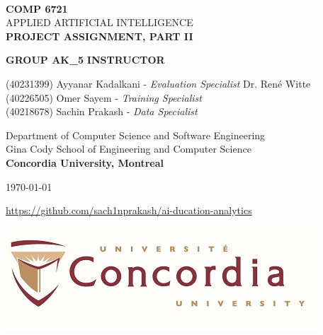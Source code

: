 \begin{titlepage}
    \begin{center}
        \textbf{\Large\\ COMP 6721}
        \vspace{1cm}
        \Huge\\  APPLIED ARTIFICIAL INTELLIGENCE
        \vspace{1cm}
        \textbf{\Large\\PROJECT ASSIGNMENT, PART II}\\
        \vspace{2cm}
    
        \Large \textbf{GROUP AK\_5} \hfill  \textbf{INSTRUCTOR}\\
        \begin{large}
            \begin{flushleft}
                \vspace{.1cm}
                (40231399) Ayyanar Kadalkani - \textit{Evaluation Specialist} \hfill Dr. René Witte\\
                (40226505) Omer Sayem - \textit{Training Specialist}\\
                (40218678) Sachin Prakash - \textit{Data Specialist}\\
            \end{flushleft}
        \end{large}
    
        \begin{Large}  
            \vspace{1 cm}
            Department of Computer Science and Software Engineering \\
            Gina Cody School of Engineering and Computer Science \\
            \textbf{Concordia University, Montreal}\\
            \vspace{1 cm}
    
            \today \\
        \end{Large}
    \end{center}
    \vspace*{3em}
    \begin{center}
        \url{https://github.com/sach1nprakash/ai-ducation-analytics}
    \end{center}
  
    \vfill
    \begin{center}
      \includegraphics[width = 50ex]{resources/concordia_med.jpg}
    \end{center}    
\end{titlepage}